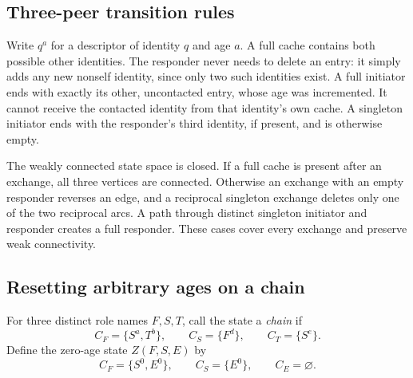 \documentclass[11pt]{article}
\begin{document}
\subsection{Three-peer transition rules}

Write $q^a$ for a descriptor of identity $q$ and age $a$.
A full cache contains both possible other identities. The responder
never needs to delete an entry: it simply adds any new nonself
identity, since only two such identities exist. A full initiator
ends with exactly its other, uncontacted entry, whose age was
incremented. It cannot receive the contacted identity from that
identity's own cache. A singleton initiator ends with the responder's
third identity, if present, and is otherwise empty.

The weakly connected state space is closed. If a full cache is
present after an exchange, all three vertices are connected.
Otherwise an exchange with an empty responder reverses an edge,
and a reciprocal singleton exchange deletes only one of the two
reciprocal arcs. A path through distinct singleton initiator and
responder creates a full responder. These cases cover every exchange
and preserve weak connectivity.

\subsection{Resetting arbitrary ages on a chain}

For three distinct role names $F,S,T$, call the state a \emph{chain}
if
\begin{equation}
 C_F=\{S^a,T^b\},\qquad C_S=\{F^d\},\qquad C_T=\{S^e\}.
 \label{eq:chain}
\end{equation}
Define the zero-age state $Z(F,S,E)$ by
\[
 C_F=\{S^0,E^0\},\qquad C_S=\{E^0\},\qquad C_E=\varnothing .
\]
\end{document}
